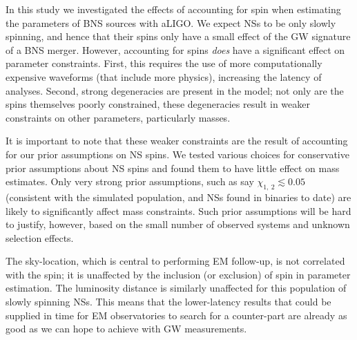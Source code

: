 In this study we investigated the effects of accounting for spin when estimating the parameters of BNS sources with aLIGO. We expect NSs to be only slowly spinning, and hence that their spins only have a small effect of the GW signature of a BNS merger. However, accounting for spins \emph{does} have a significant effect on parameter constraints. First, this requires the use of more computationally expensive waveforms (that include more physics), increasing the latency of analyses. Second, strong degeneracies are present in the model; not only are the spins themselves poorly constrained, these degeneracies result in weaker constraints on other parameters, particularly masses.

It is important to note that these weaker constraints are the result of accounting for our prior assumptions on NS spins.  We tested various choices for conservative prior assumptions about NS spins and found them to have little effect on mass estimates.  Only very strong prior assumptions, such as say $\chi_{1,~2}\lesssim 0.05$ (consistent with the simulated population, and NSs found in binaries to date) are likely to significantly affect mass constraints.  Such prior assumptions will be hard to justify, however, based on the small number of observed systems and unknown selection effects. 

The sky-location, which is central to performing EM follow-up, is not correlated with the spin; it is unaffected by the inclusion (or exclusion) of spin in parameter estimation. The luminosity distance is similarly unaffected for this population of slowly spinning NSs. This means that the lower-latency results that could be supplied in time for EM observatories to search for a counter-part are already as good as we can hope to achieve with GW measurements.
  
  
  